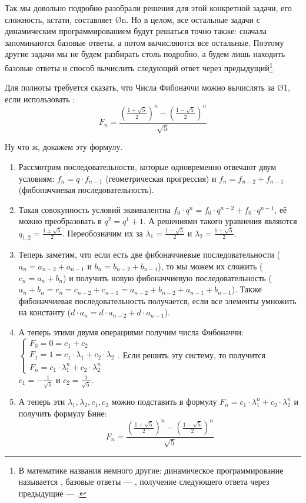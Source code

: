 Так мы довольно подробно разобрали решения для этой конкретной задачи, его сложность, кстати, составляет \O{n}. Но в целом, все остальные задачи с динамическим программированием будут решаться точно также: сначала запоминаются базовые ответы, а потом вычисляются все остальные. Поэтому другие задачи мы не будем разбирать столь подробно, а будем лишь находить базовые ответы и способ вычислить следующий ответ через предыдущий\footnote{В математике названия немного другие: динамическое программирование называется , базовые ответы — , получение следующего ответа через предыдущие — .
}. 

Для полноты требуется сказать, что Числа Фибоначчи можно вычислять за \O{1}, если использовать :
$$ F_n = \frac{ \left(\frac{1 + \sqrt{5}}{2}\right)^n - \left(\frac{1 - \sqrt{5}}{2}\right)^n }{\sqrt{5}} $$

Ну что ж, докажем эту формулу.

\begin{box-proof}
    \begin{enumerate}
        \item Рассмотрим последовательности, которые одновременно отвечают двум условиям: $f_n = q \cdot f_{n - 1}$ (геометрическая прогрессия) и $f_n = f_{n - 2} + f_{n - 1}$ (фибоначчиевая последовательность).
        \item Такая совокупность условий эквивалентна $f_0 \cdot q^n = f_0 \cdot q^{n - 2} + f_0 \cdot q^{n - 1}$, её можно преобразовать в $q^2 = q^1 + 1$. А решениями такого уравнения являются $q_{1, 2} = \frac{1 \pm \sqrt{5}}{2}$. Переобозначим их за $\lambda_1 = \frac{1 - \sqrt{5}}{2}$ и $\lambda_2 = \frac{1 + \sqrt{5}}{2}$.
        \item Теперь заметим, что если есть две фибоначчиевые последовательности ($a_n = a_{n - 2} + a_{n - 1}$ и $b_n = b_{n - 2} + b_{n - 1}$), то мы можем их сложить ($c_n = a_n + b_n$) и получить новую фибоначчиевую последовательность ($a_n + b_n = c_n = c_{n - 2} + c_{n - 1} = a_{n - 2} + b_{n - 2} + a_{n - 1} + b_{n - 1}$). Также фибоначчиевая последовательность получается, если все элементы умножить на константу ($d \cdot a_n = d \cdot a_{n - 2} + d \cdot a_{n - 1}$).
        \item А теперь этими двумя операциями получим числа Фибоначчи:
            $\begin{cases}
            F_0=0=c_1 + c_2 \\
            F_1=1=c_1 \cdot \lambda_1 + c_2 \cdot \lambda_2 \\
            F_n= c_1 \cdot \lambda_1^n + c_2 \cdot \lambda_2^n
            \end{cases}$.
        Если решить эту систему, то получится $c_1 = -\frac{1}{\sqrt{5}}$ и $c_2 = \frac{1}{\sqrt{5}}$.
        \item А теперь эти $\lambda_1, \lambda_2, c_1, c_2$ можно подставить в формулу $F_n= c_1 \cdot \lambda_1^n + c_2 \cdot \lambda_2^n$ и получить формулу Бине:
        $$ F_n = \frac{ \left(\frac{1 + \sqrt{5}}{2}\right)^n - \left(\frac{1 - \sqrt{5}}{2}\right)^n }{\sqrt{5}} $$
    \end{enumerate}
\end{box-proof}


